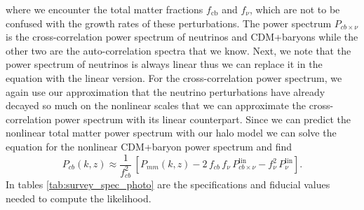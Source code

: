 \documentclass[../main.tex]{subfiles}
\begin{document}
where we encounter the total matter fractions $f_\mathrm{cb}$ and $f_\nu$, which are not to be confused with the growth rates of these perturbations. The power spectrum $P_{cb\times\nu}$ is the cross-correlation power spectrum of neutrinos and CDM+baryons while the other two are the auto-correlation spectra that we know. Next, we note that the power spectrum of neutrinos is always linear thus we can replace it in the equation with the linear version. For the cross-correlation power spectrum, we again use our approximation that the neutrino perturbations have already decayed so much on the nonlinear scales that we can approximate the cross-correlation power spectrum with its linear counterpart. Since we can predict the nonlinear total matter power spectrum with our halo model we can solve the equation for the nonlinear CDM+baryon power spectrum and find 
\begin{equation}
    P_{cb}(k,z) \approx \frac{1}{f_{cb}^2}\,\left[P_{mm}(k,z)-2\,f_{cb}\,f_\nu\,P^\mathrm{lin}_{cb\times\nu}-f_{\nu}^2\,P^\mathrm{lin}_{\nu}\right].
\end{equation}   
In tables \ref{tab:survey_spec_photo} are the specifications and fiducial values needed to compute the likelihood.
\end{document}
